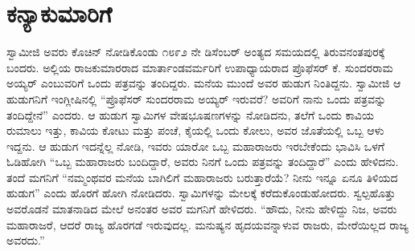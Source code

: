 
\chapter{ಕನ್ಯಾಕುಮಾರಿಗೆ}

 ಸ್ವಾಮೀಜಿ ಅವರು ಕೊಚಿನ್ ನೋಡಿಕೊಂಡು ೧೮೯೨ ನೇ ಡಿಸೆಂಬರ್ ಅಂತ್ಯದ ಸಮಯದಲ್ಲಿ ತಿರುವನಂತಪುರಕ್ಕೆ ಬಂದರು. ಅಲ್ಲಿಯ ರಾಜಕುಮಾರರಾದ ಮಾರ್ತಾಂಡವರ್ಮರಿಗೆ ಉಪಾಧ್ಯಾಯರಾದ ಪ್ರೊಫೆಸರ್ ಕೆ. ಸುಂದರರಾಮ ಅಯ್ಯರ್ ಎಂಬುವರಿಗೆ ಒಂದು ಪತ್ರವನ್ನು ತಂದಿದ್ದರು. ಮನೆಯ ಮುಂದೆ ಅವರ ಹುಡುಗ ನಿಂತಿದ್ದನು. ಸ್ವಾಮೀಜಿ ಆ ಹುಡುಗನಿಗೆ ಇಂಗ್ಲೀಷಿನಲ್ಲಿ “ಪ್ರೊಫೆಸರ್ ಸುಂದರರಾಮ ಅಯ್ಯರ್ ಇರುವರೆ? ಅವರಿಗೆ ನಾನು ಒಂದು ಪತ್ರವನ್ನು ತಂದಿದ್ದೇನೆ” ಎಂದರು. ಆ ಹುಡುಗ ಸ್ವಾಮಿಗಳ ವೇಷಭೂಷಣಗಳನ್ನು ನೋಡಿದನು, ತಲೆಗೆ ಒಂದು ಕಾವಿಯ ರುಮಾಲು ಇತ್ತು, ಕಾವಿಯ ಕೋಟು ಮತ್ತು ಪಂಚೆ, ಕೈಯಲ್ಲಿ ಒಂದು ಕೋಲು, ಅವರ ಜೊತೆಯಲ್ಲಿ ಒಬ್ಬ ಆಳು ಇದ್ದನು. ಆ ಹುಡುಗ ಇದನ್ನೆಲ್ಲ ನೋಡಿ, ಇವರು ಯಾರೋ ಒಬ್ಬ ಮಹಾರಾಜರು ಇರಬೇಕೆಂದು ಭಾವಿಸಿ ಒಳಗೆ ಓಡಿಹೋಗಿ “ಒಬ್ಬ ಮಹಾರಾಜರು ಬಂದಿದ್ದಾರೆ, ಅವರು ನಿನಗೆ ಒಂದು ಪತ್ರವನ್ನು ತಂದಿದ್ದಾರೆ” ಎಂದು ಹೇಳಿದನು. ತಂದೆ ಮಗನಿಗೆ “ನಮ್ಮಂಥವರ ಮನೆಯ ಬಾಗಿಲಿಗೆ ಮಹಾರಾಜರು ಬರುತ್ತಾರೆಯೆ? ನೀನು ಇನ್ನೂ ಏನೂ ತಿಳಿಯದ ಹುಡುಗ” ಎಂದು ಹೊರಗೆ ಹೋಗಿ ನೋಡಿದರು. ಸ್ವಾಮಿಗಳನ್ನು ಮೇಲಕ್ಕೆ ಕರೆದುಕೊಂಡುಹೋದರು. ಸ್ವಲ್ಪಹೊತ್ತು ಅವರೊಡನೆ ಮಾತನಾಡಿದ ಮೇಲೆ ಅನಂತರ ಅವರ ಮಗನಿಗೆ ಹೇಳಿದರು. “ಹೌದು, ನೀನು ಹೇಳಿದ್ದು ನಿಜ, ಅವರು ಮಹಾರಾಜರೆ, ಆದರೆ ರಾಜ್ಯ ಹೊರಗಡೆ ಇರುವುದಲ್ಲ. ಮನುಷ್ಯನ ಹೃದಯವನ್ನಾಳುವ ರಾಜರು, ಮೇರೆಯಿಲ್ಲದ ರಾಜ್ಯ ಅವರದು.” 

